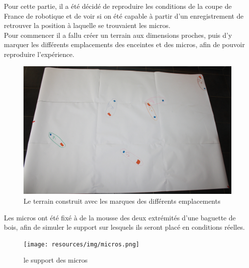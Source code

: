 \documentclass[12pt,a4paper]{report}
\begin{document}
Pour cette partie, il a été décidé de reproduire les conditions de la coupe de France de robotique et de voir si on été capable à partir d'un enregistrement de retrouver la position à laquelle se trouvaient les micros.\\
Pour commencer il a fallu créer un terrain aux dimensions proches, puis d'y marquer les différents emplacements des enceintes et des micros, afin de pouvoir reproduire l'expérience.\\
\begin{figure}[H]
\includegraphics[width=15cm]{resources/img/terrain.jpg}
\caption{Le terrain construit avec les marques des différents emplacements}
\end{figure}

Les micros ont été fixé à de la mousse des deux extrémités d'une baguette de bois, afin de simuler le support sur lesquels ils seront placé en conditions réelles.
\begin{figure}[H]
\texttt{[image: resources/img/micros.png]}
\caption{le support des micros}
\end{figure}
\end{document}
